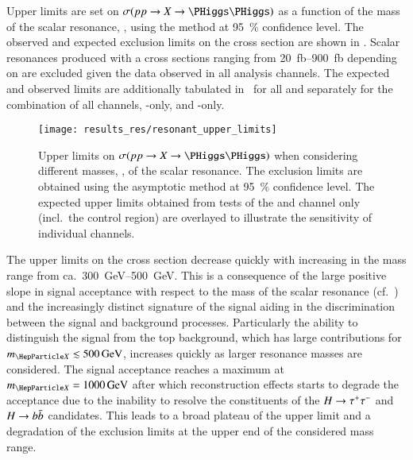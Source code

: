 Upper limits are set on $\sigma(pp \to X \to \HH)$ as a function of
the mass of the scalar resonance, \mX, using the \CLs method at
\SI{95}{\percent} confidence level. The observed and expected
exclusion limits on the cross section are shown in
. Scalar resonances produced with a cross
sections ranging from \SIrange{20}{900}{\femto\barn} depending on \mX
are excluded given the data observed in all analysis channels. The
expected and observed limits are additionally tabulated
in~ for all \mX and separately for the
combination of all channels, \lephad-only, and \hadhad-only.

\begin{figure}[htbp]
  \centering

  \texttt{[image: results\_res/resonant\_upper\_limits]}

  \caption{Upper limits on $\sigma(pp \to X \to \HH)$ when considering
    different masses, \mX, of the scalar resonance. The exclusion
    limits are obtained using the asymptotic \CLs method at
    \SI{95}{\percent} confidence level. The expected upper limits
    obtained from tests of the \lephad and \hadhad channel only
    (incl.\ the control region) are overlayed to illustrate the
    sensitivity of individual channels.}%
  \label{fig:res_upper_limits}
\end{figure}

The upper limits on the cross section decrease quickly with increasing
\mX in the mass range from ca.\ \SIrange{300}{500}{\GeV}. This is a
consequence of the large positive slope in signal acceptance with
respect to the mass of the scalar resonance
(cf.~) and the increasingly
distinct signature of the signal aiding in the discrimination between
the signal and background processes. Particularly the ability to
distinguish the signal from the top background, which has large
contributions for $\mX \lesssim \SI{500}{\GeV}$, increases quickly as larger resonance masses
are considered. The signal acceptance reaches a maximum at
$\mX = \SI{1000}{\GeV}$ after which reconstruction effects starts to
degrade the acceptance due to the inability to resolve the
constituents of the $H \to \tau^{+} \tau^{-}$ and $H \to b\bar{b}$
candidates. This leads to a broad plateau of the upper limit and a
degradation of the exclusion limits at the upper end of the considered
mass range.

